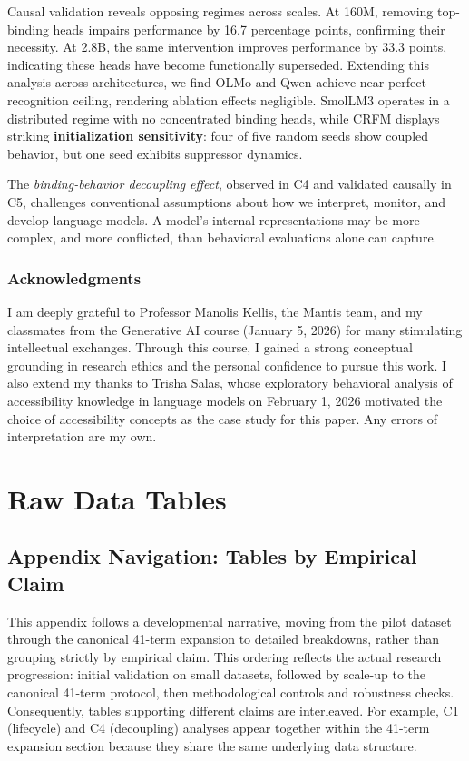 \documentclass[10pt]{article} %
\begin{document}
Causal validation reveals opposing regimes across scales. At 160M, removing top-binding heads impairs performance by 16.7 percentage points, confirming their necessity. At 2.8B, the same intervention improves performance by 33.3 points, indicating these heads have become functionally superseded. Extending this analysis across architectures, we find OLMo and Qwen achieve near-perfect recognition ceiling, rendering ablation effects negligible. SmolLM3 operates in a distributed regime with no concentrated binding heads, while CRFM displays striking \textbf{initialization sensitivity}: four of five random seeds show coupled behavior, but one seed exhibits suppressor dynamics.

The \emph{binding-behavior decoupling effect}, observed in C4 and validated causally in C5, challenges conventional assumptions about how we interpret, monitor, and develop language models.
A model's internal representations may be more complex, and more conflicted, than behavioral evaluations alone can capture.

\subsubsection*{Acknowledgments}
I am deeply grateful to Professor Manolis Kellis, the Mantis team, and my classmates from the Generative AI course (January 5, 2026) for many stimulating intellectual exchanges. Through this course, I gained a strong conceptual grounding in research ethics and the personal confidence to pursue this work. I also extend my thanks to Trisha Salas, whose exploratory behavioral analysis of accessibility knowledge in language models \citep{salas2026testing} on February 1, 2026 motivated the choice of accessibility concepts as the case study for this paper. Any errors of interpretation are my own.

\pagebreak
\appendix

\section{Raw Data Tables}

\subsection*{Appendix Navigation: Tables by Empirical Claim}\mbox{}

\noindent This appendix follows a developmental narrative, moving from the pilot dataset through the canonical 41-term expansion to detailed breakdowns, rather than grouping strictly by empirical claim. This ordering reflects the actual research progression: initial validation on small datasets, followed by scale-up to the canonical 41-term protocol, then methodological controls and robustness checks. Consequently, tables supporting different claims are interleaved. For example, C1 (lifecycle) and C4 (decoupling) analyses appear together within the 41-term expansion section because they share the same underlying data structure.
\end{document}
